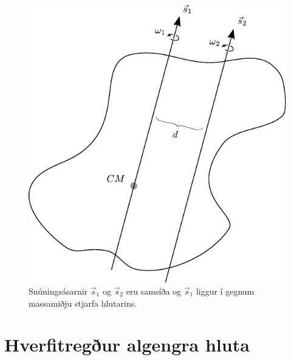 \begin{figure}[H]
    \centering
    \includegraphics[scale=1]{figures/steiner2.pdf}
    \caption{Snúningsásarnir $\vec{s}_1$ og $\vec{s}_2$ eru samsíða og $\vec{s}_1$ liggur í gegnum massamiðju stjarfa hlutarins.}
    \label{fig:steiner}
\end{figure}

\newpage

\section{Hverfitregður algengra hluta}

